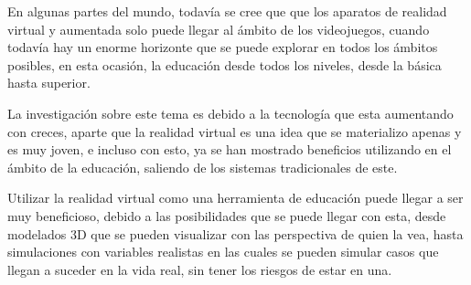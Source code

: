 En algunas partes del mundo, todavía se cree que que los aparatos de realidad virtual y aumentada solo puede llegar al ámbito de los videojuegos, cuando todavía hay un enorme horizonte que se puede explorar en todos los ámbitos posibles, en esta ocasión, la educación desde todos los niveles, desde la básica hasta superior.

La investigación sobre este tema es debido a la tecnología que esta aumentando con creces, aparte que la realidad virtual es  una idea que se materializo apenas y es muy joven, e incluso con esto, ya se han mostrado beneficios utilizando en el ámbito de la educación, saliendo de los sistemas tradicionales de este.

Utilizar la realidad virtual como una herramienta de educación puede llegar a ser muy beneficioso, debido a las posibilidades que se puede llegar con esta, desde modelados 3D que se pueden visualizar con las perspectiva de quien la vea, hasta simulaciones con variables realistas en las cuales se pueden simular casos que llegan a suceder en la vida real, sin tener los riesgos de estar en una.
